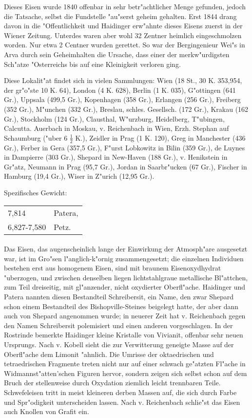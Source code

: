 \documentclass[a4paper, 11pt, oneside]{article}
\begin{document}
Dieses Eisen wurde 1840 offenbar in sehr betr"achtlicher Menge gefunden, jedoch die Tatsache, selbst die Fundstelle "au"serst geheim gehalten. Erst 1844 drang davon in die "Offentlichkeit und Haidinger erw"ahnte dieses Eisens zuerst in der Wiener Zeitung. Unterdes waren aber wohl 32 Zentner heimlich eingeschmolzen worden. Nur etwa 2 Centner wurden gerettet. So war der Bergingenieur Wei"s in Arva durch sein Geheimhalten die Ursache, dass einer der merkw"urdigsten Sch"atze "Osterreichs bis auf eine Kleinigkeit verloren ging.

Diese Lokalit"at findet sich in vielen Sammlungen: Wien (18 St., 30 K. 353,954, der gr"o"ste 10 K. 64), London (4 K. 628), Berlin (1 K. 035), G"ottingen (641 Gr.), Uppsala (499,5 Gr.), Kopenhagen (358 Gr.), Erlangen (256 Gr.), Freiberg (352 Gr.), M"unchen (332 Gr.), Breslau, schles. Gesellsch. (172 Gr.), Krakau (162 Gr.), Stockholm (124 Gr.), Clausthal, W"urzburg, Heidelberg, T"ubingen, Calcutta. Auerbach in Moskau, v. Reichenbach in Wien, Erzh. Stephan auf Schaumburg ("uber 6 $\frac{1}{2}$ K.), Zeidler in Prag (1 K. 120), Greg in Manchester (436 Gr.), Ferber in Gera (357,5 Gr.), F"urst Lobkowitz in Bilin (359 Gr.), de Luynes in Dampierre (303 Gr.), Shepard in New-Haven (188 Gr.), v. Henikstein in Gr"atz, Neumann in Prag (95,7 Gr.), Jordan in Saarbr"ucken (67 Gr.), Fischer in Hamburg (19,4 Gr.), Wiser in Z"urich (12,95 Gr.).

Spezifisches Gewicht:  
\begin{table}[!ht]
    \centering
    \begin{tabular}{l l}
        7,814 & Patera,\\
        6,827-7,580 & Petz.
    \end{tabular}
\end{table}
\paragraph{}
Das Eisen, das augenscheinlich lange der Einwirkung der Atmosph"are ausgesetzt war, ist im Gro"sen l"anglich-k"ornig zusammengesetzt; die einzelnen Individuen bestehen erst aus homogenem Eisen, sind mit braunem Eisenoxydhydrat "uberzogen, und zwischen denselben liegen lichtstahlgraue metallische Bl"attchen, zum Teil dreiseitig, mit gl"anzender, nicht oxydierter Oberfl"ache. Haidinger und Patera nannten diesen Bestandteil Schreibersit, ein Name, den zwar Shepard schon einem Bestandteil des Bishopville-Steines beigelegt hatte, der aber dann auch von Shepard angenommen wurde; in neuerer Zeit hat v. Reichenbach gegen den Namen Schreibersit polemisiert und einen anderen vorgeschlagen. In der Rostrinde bemerkte Haidinger kleine Kristalle von Vivianit, offenbar sehr neuen Ursprungs. Nach v. Kobell sieht die zur Verwitterung geneigte Masse auf der Oberfl"ache dem Limonit "ahnlich. Die Umrisse der oktaedrischen und tetraedrischen Fragmente treten nicht nur auf einer schwach ge"atzten Fl"ache in Widmannst"atten'schen Figuren hervor, sondern zeigen sich selbst schon auf dem Bruch der stellenweise durch Oxydation ziemlich leicht trennbaren Teile. Schwefeleisen tritt in meist kleineren derben Massen auf, die sich durch Farbe und Spr"odigkeit unterscheiden lassen. Nach v. Reichenbach schlie"st das Eisen auch Knollen von Grafit ein.
\end{document}
